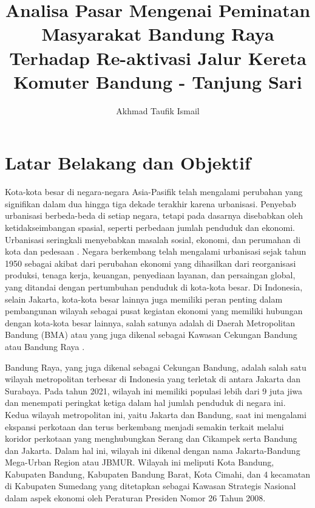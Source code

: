 \documentclass{article}
\begin{document}
\title{Analisa Pasar Mengenai Peminatan Masyarakat Bandung Raya Terhadap Re-aktivasi Jalur Kereta Komuter Bandung - Tanjung Sari}
\author{Akhmad Taufik Ismail}
\maketitle

\section{Latar Belakang dan Objektif} \par

Kota-kota besar di negara-negara Asia-Pasifik telah mengalami perubahan yang signifikan dalam dua hingga tiga dekade terakhir karena urbanisasi. Penyebab urbanisasi berbeda-beda di setiap negara, tetapi pada dasarnya disebabkan oleh ketidakseimbangan spasial, seperti perbedaan jumlah penduduk dan ekonomi. Urbanisasi seringkali menyebabkan masalah sosial, ekonomi, dan perumahan di kota dan pedesaan \cite{Rustiadi2009}. Negara berkembang telah mengalami urbanisasi sejak tahun 1950 sebagai akibat dari perubahan ekonomi yang dihasilkan dari reorganisasi produksi, tenaga kerja, keuangan, penyediaan layanan, dan persaingan global, yang ditandai dengan pertumbuhan penduduk di kota-kota besar. Di Indonesia, selain Jakarta, kota-kota besar lainnya juga memiliki peran penting dalam pembangunan wilayah sebagai pusat kegiatan ekonomi yang memiliki hubungan dengan kota-kota besar lainnya, salah satunya adalah di Daerah Metropolitan Bandung (BMA) atau yang juga dikenal sebagai Kawasan Cekungan Bandung atau Bandung Raya \cite{Fuadina2021}. \par

Bandung Raya, yang juga dikenal sebagai Cekungan Bandung, adalah salah satu wilayah metropolitan terbesar di Indonesia yang terletak di antara Jakarta dan Surabaya. Pada tahun 2021, wilayah ini memiliki populasi lebih dari 9 juta jiwa \cite{BPS_Kota_Bandung_2022} \cite{BPS_Kota_Cimahi_2022} \cite{BPS_Kabupaten_Bandung_2022} \cite{BPS_Kabupaten_Bandung_Barat_2022} \cite{BPS_Kabupaten_Sumedang_2022} dan menempati peringkat ketiga dalam hal jumlah penduduk di negara ini. Kedua wilayah metropolitan ini, yaitu Jakarta dan Bandung, saat ini mengalami ekspansi perkotaan dan terus berkembang menjadi semakin terkait melalui koridor perkotaan yang menghubungkan Serang dan Cikampek serta Bandung dan Jakarta. Dalam hal ini, wilayah ini dikenal dengan nama Jakarta-Bandung Mega-Urban Region atau JBMUR. Wilayah ini meliputi Kota Bandung, Kabupaten Bandung, Kabupaten Bandung Barat, Kota Cimahi, dan 4 kecamatan di Kabupaten Sumedang yang ditetapkan sebagai Kawasan Strategis Nasional dalam aspek ekonomi oleh Peraturan Presiden Nomor 26 Tahun 2008. \par
\end{document}
